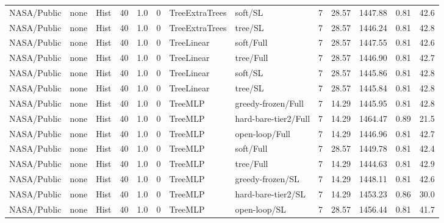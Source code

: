 \documentclass[10pt,a4paper]{article}
\begin{document}
\begin{landscape}
\begin{longtable}{llllllllrrrrr}
NASA/Public & none & Hist & 40 & 1.0 & 0 & TreeExtraTrees & soft/SL & 7 & 28.57 & 1447.88 & 0.81 & 42.6 \\

NASA/Public & none & Hist & 40 & 1.0 & 0 & TreeExtraTrees & tree/SL & 7 & 28.57 & 1446.24 & 0.81 & 42.8 \\

NASA/Public & none & Hist & 40 & 1.0 & 0 & TreeLinear & soft/Full & 7 & 28.57 & 1447.55 & 0.81 & 42.6 \\

NASA/Public & none & Hist & 40 & 1.0 & 0 & TreeLinear & tree/Full & 7 & 28.57 & 1446.90 & 0.81 & 42.7 \\

NASA/Public & none & Hist & 40 & 1.0 & 0 & TreeLinear & soft/SL & 7 & 28.57 & 1445.86 & 0.81 & 42.8 \\

NASA/Public & none & Hist & 40 & 1.0 & 0 & TreeLinear & tree/SL & 7 & 28.57 & 1445.84 & 0.81 & 42.8 \\

NASA/Public & none & Hist & 40 & 1.0 & 0 & TreeMLP & greedy-frozen/Full & 7 & 14.29 & 1445.95 & 0.81 & 42.8 \\

NASA/Public & none & Hist & 40 & 1.0 & 0 & TreeMLP & hard-bare-tier2/Full & 7 & 14.29 & 1464.47 & 0.89 & 21.5 \\

NASA/Public & none & Hist & 40 & 1.0 & 0 & TreeMLP & open-loop/Full & 7 & 14.29 & 1446.96 & 0.81 & 42.7 \\

NASA/Public & none & Hist & 40 & 1.0 & 0 & TreeMLP & soft/Full & 7 & 28.57 & 1449.78 & 0.81 & 42.4 \\

NASA/Public & none & Hist & 40 & 1.0 & 0 & TreeMLP & tree/Full & 7 & 14.29 & 1444.63 & 0.81 & 42.9 \\

NASA/Public & none & Hist & 40 & 1.0 & 0 & TreeMLP & greedy-frozen/SL & 7 & 14.29 & 1448.11 & 0.81 & 42.6 \\

NASA/Public & none & Hist & 40 & 1.0 & 0 & TreeMLP & hard-bare-tier2/SL & 7 & 14.29 & 1453.23 & 0.86 & 30.0 \\

NASA/Public & none & Hist & 40 & 1.0 & 0 & TreeMLP & open-loop/SL & 7 & 28.57 & 1456.44 & 0.81 & 41.7 \\


\end{longtable}
\end{landscape}
\end{document}
